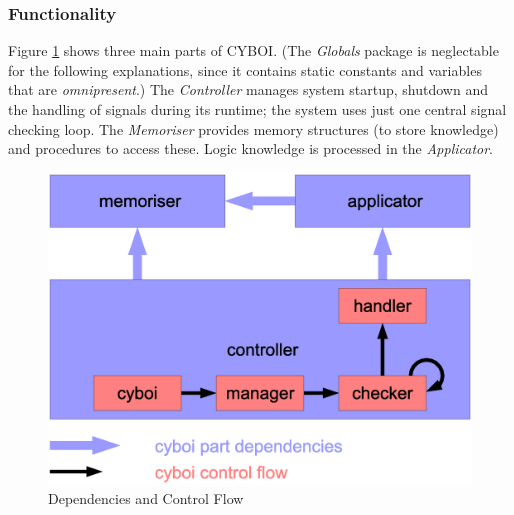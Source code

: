 %
%
%
%
%
%
%

\subsubsection{Functionality}
\label{functionality_heading}

Figure \ref{cyboi_figure} shows three main parts of CYBOI. (The \emph{Globals}
package is neglectable for the following explanations, since it contains static
constants and variables that are \emph{omnipresent}.) The \emph{Controller}
manages system startup, shutdown and the handling of signals during its
runtime; the system uses just one central signal checking loop. The
\emph{Memoriser} provides memory structures (to store knowledge) and procedures
to access these. Logic knowledge is processed in the \emph{Applicator}.

\begin{figure}[ht]
    \begin{center}
        \includegraphics[scale=0.2]{vector/dependencies.eps}
        \caption{Dependencies and Control Flow}
        \label{cyboi_figure}
    \end{center}
\end{figure}
